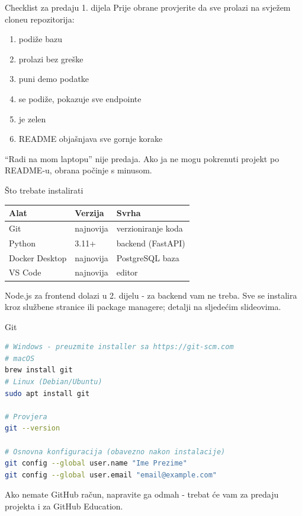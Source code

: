 \begin{frame}{Checklist za predaju 1. dijela}
Prije obrane provjerite da sve prolazi na svježem cloneu repozitorija:

\vspace{0.4em}
\begin{enumerate}
  \item {} podiže bazu
  \item {} prolazi bez greške
  \item {} puni demo podatke
  \item {} se podiže,  pokazuje sve endpointe
  \item {} je zelen
  \item README objašnjava sve gornje korake
\end{enumerate}

\vspace{0.4em}
\enquote{Radi na mom laptopu} nije predaja. Ako ja ne mogu pokrenuti projekt po README-u, obrana počinje s minusom.
\end{frame}


\begin{frame}{Što trebate instalirati}
\begin{tabular}{@{}lll@{}}
  \toprule
  \textbf{Alat} & \textbf{Verzija} & \textbf{Svrha} \\
  \midrule
  Git & najnovija & verzioniranje koda \\
  Python & 3.11+ & backend (FastAPI) \\
  Docker Desktop & najnovija & PostgreSQL baza \\
  VS Code & najnovija & editor \\
  \bottomrule
\end{tabular}

\vspace{0.6em}
Node.js za frontend dolazi u 2. dijelu - za backend vam ne treba. Sve se instalira kroz službene stranice ili package managere; detalji na sljedećim slideovima.
\end{frame}

\begin{frame}[fragile,shrink=5]{Git}
\begin{lstlisting}[language=bash]
# Windows - preuzmite installer sa https://git-scm.com
# macOS
brew install git
# Linux (Debian/Ubuntu)
sudo apt install git

# Provjera
git --version

# Osnovna konfiguracija (obavezno nakon instalacije)
git config --global user.name "Ime Prezime"
git config --global user.email "email@example.com"
\end{lstlisting}

\vspace{0.4em}
Ako nemate GitHub račun, napravite ga odmah - trebat će vam za predaju projekta i za GitHub Education.
\end{frame}

